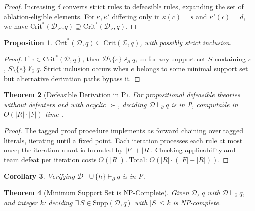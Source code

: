 \documentclass{article}
\newtheorem{theorem}{Theorem}[section]
\newtheorem{proposition}[theorem]{Proposition}
\newtheorem{corollary}[theorem]{Corollary}
\theoremstyle{definition}
\newcommand{\D}{\mathcal{D}}
\newcommand{\Dm}{\mathcal{D}^{-}}
\newcommand{\partfunc}{\kappa}
\newcommand{\Supp}{\mathrm{Supp}}
\newcommand{\Crit}{\mathrm{Crit}}
\newcommand{\CritStar}{\mathrm{Crit}^{*}}
\newcommand{\pPartial}{\vdash_{\partial}}
\begin{document}
\begin{proof}
Increasing $\delta$ converts strict rules to defeasible rules, expanding the set of ablation-eligible elements. For $\partfunc, \partfunc'$ differing only in $\partfunc(c) = s$ and $\partfunc'(c) = d$, we have $\CritStar(\D_{\partfunc'}, q) \supseteq \CritStar(\D_\partfunc, q)$.
\end{proof}

\begin{proposition}\label{prop:critinclusion}
$\CritStar(\D, q) \subseteq \Crit(\D, q)$, with possibly strict inclusion.
\end{proposition}

\begin{proof}
If $e \in \CritStar(\D, q)$, then $\D \setminus \{e\} \not\pPartial q$, so for any support set $S$ containing $e$, $S \setminus \{e\} \not\pPartial q$. Strict inclusion occurs when $e$ belongs to some minimal support set but alternative derivation paths bypass it.
\end{proof}

\begin{theorem}[Defeasible Derivation in P]\label{thm:derivP}
For propositional defeasible theories without defeaters and with acyclic $\succ$, deciding $\D \pPartial q$ is in P, computable in $O(|R| \cdot |F|)$ time \cite{maher2001propositional, billington2010framework}.
\end{theorem}

\begin{proof}
The tagged proof procedure implements as forward chaining over tagged literals, iterating until a fixed point. Each iteration processes each rule at most once; the iteration count is bounded by $|F| + |R|$. Checking applicability and team defeat per iteration costs $O(|R|)$. Total: $O(|R| \cdot (|F| + |R|))$.
\end{proof}

\begin{corollary}\label{cor:verif}
Verifying $\Dm \cup \{h\} \pPartial q$ is in P.
\end{corollary}

\begin{theorem}[Minimum Support Set is NP-Complete]\label{thm:suppNP}
Given $\D$, $q$ with $\D \pPartial q$, and integer $k$: deciding $\exists\, S \in \Supp(\D, q)$ with $|S| \leq k$ is NP-complete.
\end{theorem}
\end{document}
